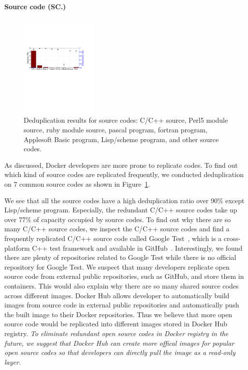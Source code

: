 \paragraph{Source code (SC.)}
%
%
\begin{figure} 
	\centering
	\includegraphics[width=0.35\textwidth]{graphs/dedup-sc} 
	\caption{Deduplication results for source codes: C/C++ source, Perl5 module source, ruby module
		source, pascal program, fortran program, Applesoft Basic program, Lisp/scheme
		program, and other source codes.  } 
	\label{fig:dedup-sc} 
\end{figure}

As discussed, Docker developers are more prone to replicate codes. 
%
To find out
which kind of source codes are replicated frequently, we conducted
deduplication on 7 common source codes as shown in Figure~\ref{fig:dedup-sc}.

We see that all the source codes have a high deduplication ratio over 90\%
except Lisp/scheme program. 
%
Especially, the redundant C/C++ source codes take
up over 77\% of capacity occupied by source codes. 
%
To find out why there are so
many C/C++ source codes, we inspect the C/C++ source codes and find a
frequently replicated C/C++ source code called Google Test~\cite{googletest}, which is
a cross-platform C++ test framework and available in GitHub~\cite{github}.
%
Interestingly, we found there are plenty of repositories related to Google Test
while there is no official repository for Google Test. 
%
We suspect that many
developers replicate open source code from external public repositories, such
as GitHub, and store them in containers. 
%
This would also explain why there are
so many shared source codes across different images. 
%
Docker Hub
allows developer to automatically build images from source code in external
public repositories and automatically push the built image to their Docker
repositories. Thus we believe that more open source code would be replicated into
different images stored in Docker Hub registry. 
%
\textit{To eliminate redundant
open source codes in Docker registry in the future, we suggest that Docker Hub
can create more offical images for popular open source codes so that developers
can directly pull the image as a read-only layer. }

